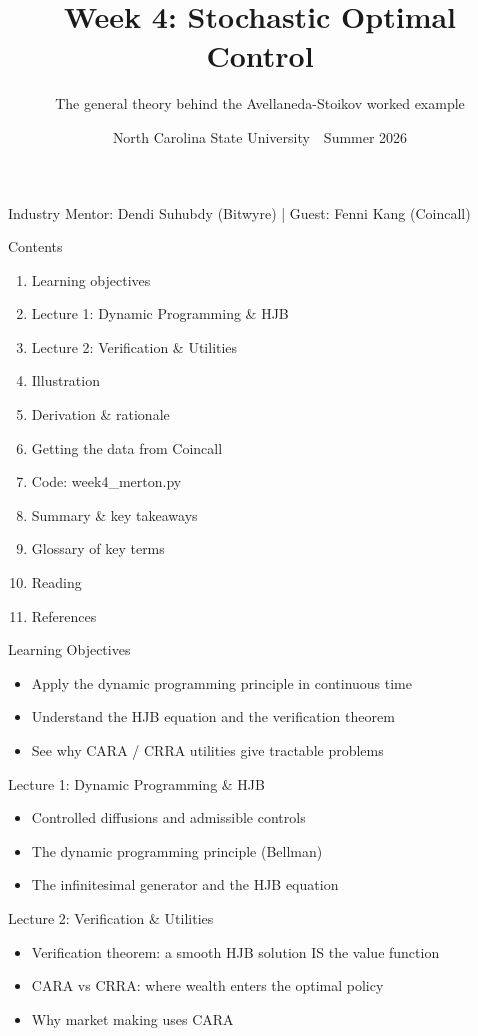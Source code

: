 \documentclass[aspectratio=169,10pt]{beamer}
\title{Week 4: Stochastic Optimal Control}
\subtitle{The general theory behind the Avellaneda-Stoikov worked example}
\date{North Carolina State University \,\textbar\, Summer 2026}
\begin{document}
\begin{frame}[plain]\titlepage\begin{center}\tiny Industry Mentor: Dendi Suhubdy (Bitwyre)  |  Guest: Fenni Kang (Coincall)\end{center}\end{frame}
\begin{frame}{Contents}
\small\begin{enumerate}\setlength{\itemsep}{3pt}
  \item Learning objectives
  \item Lecture 1: Dynamic Programming \& HJB
  \item Lecture 2: Verification \& Utilities
  \item Illustration
  \item Derivation \& rationale
  \item Getting the data from Coincall
  \item Code: week4\_merton.py
  \item Summary \& key takeaways
  \item Glossary of key terms
  \item Reading
  \item References
\end{enumerate}
\end{frame}

\begin{frame}{Learning Objectives}
\begin{itemize}
  \item Apply the dynamic programming principle in continuous time
  \item Understand the HJB equation and the verification theorem
  \item See why CARA / CRRA utilities give tractable problems
\end{itemize}
\end{frame}

\begin{frame}{Lecture 1: Dynamic Programming \& HJB}
\begin{itemize}
  \item Controlled diffusions and admissible controls
  \item The dynamic programming principle (Bellman)
  \item The infinitesimal generator and the HJB equation
\end{itemize}
\end{frame}

\begin{frame}{Lecture 2: Verification \& Utilities}
\begin{itemize}
  \item Verification theorem: a smooth HJB solution IS the value function
  \item CARA vs CRRA: where wealth enters the optimal policy
  \item Why market making uses CARA
\end{itemize}
\end{frame}
\end{document}
